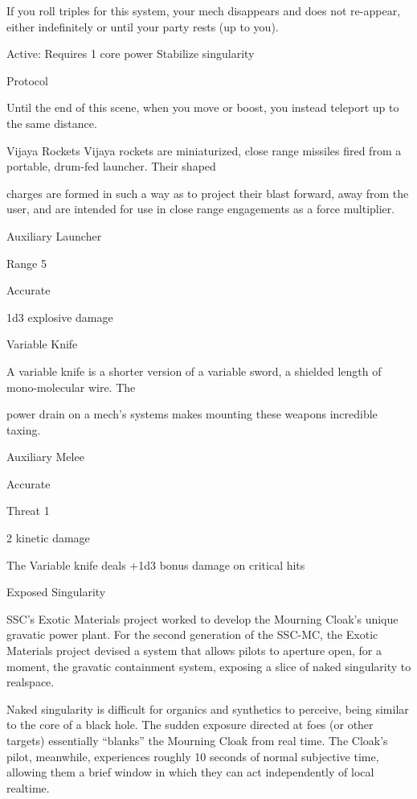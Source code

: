    If you roll triples for this system, your mech disappears and does not re-appear, either indefinitely or  
   until your party rests (up to you).
 

  Active: Requires 1 core power  
  Stabilize singularity
 
   Protocol
 
   Until the end of this scene, when you move or boost, you instead teleport up to the same distance. 

Vijaya Rockets  
Vijaya rockets are miniaturized, close range missiles fired from a portable, drum-fed launcher. Their shaped  

charges are formed in such a way as to project their blast forward, away from the user, and are intended for  
use in close range engagements as a force multiplier.   

Auxiliary Launcher
 
Range 5
 
Accurate
 
1d3 explosive damage
 

Variable Knife  

A variable knife is a shorter version of a variable sword, a shielded length of mono-molecular wire. The  

power drain on a mech’s systems makes mounting these weapons incredible taxing.  

Auxiliary Melee
 
Accurate
 
Threat 1
 
2 kinetic damage
 
The Variable knife deals +1d3 bonus damage on critical hits  

Exposed Singularity  

                                                                                                                   


SSC’s Exotic Materials project worked to develop the Mourning Cloak’s unique gravatic power plant. For the  
second generation of the SSC-MC, the Exotic Materials project devised a system that allows pilots to  
aperture open, for a moment, the gravatic containment system, exposing a slice of naked singularity to  
realspace.   

Naked singularity is difficult for organics and synthetics to perceive, being similar to the core of a black hole.  
The sudden exposure directed at foes (or other targets) essentially “blanks” the Mourning Cloak from real  
time. The Cloak’s pilot, meanwhile, experiences roughly 10 seconds of normal subjective time, allowing  
them a brief window in which they can act independently of local realtime.   

